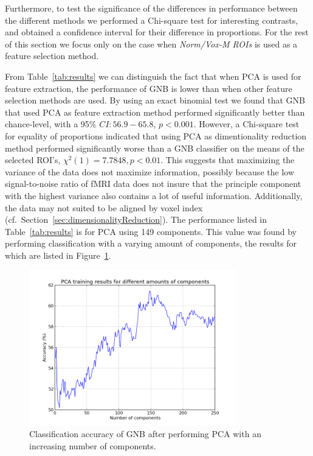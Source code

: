 \documentclass[preprint,journal,11pt]{vgtc}
\begin{document}
Furthermore, to test the significance of the differences in performance between the different methods we performed a Chi-square test for interesting contrasts, and obtained a confidence interval for their difference in proportions. For the rest of this section we focus only on the case when \emph{Norm/Vox-M ROIs} is used as a feature selection method.

From Table~\ref{tab:results} we can distinguish the fact that when PCA is used for feature extraction, the performance of GNB is lower than when other feature selection methods are used. By using an exact binomial test we found that GNB that used PCA as feature extraction method performed significantly better than chance-level, with a 95\% $CI: 56.9 - 65.8$, $p < 0.001$. However, a Chi-square test for equality of proportions indicated that using PCA as dimentionality reduction method performed significantly worse than a GNB classifier on the means of the selected ROI's, $\chi^2(1) = 7.7848, p < 0.01$. This suggests that maximizing the variance of the data does not maximize information, possibly because the low signal-to-noise ratio of fMRI data does not insure that the principle component with the highest variance also contains a lot of useful information. Additionally, the data may not suited to be aligned by voxel index (cf.~Section~\ref{sec:dimensionalityReduction}). The performance listed in Table~\ref{tab:results} is for PCA using 149 components. This value was found by performing classification with a varying amount of components, the results for which are listed in Figure~\ref{fig:pca_components}.

\begin{figure}
	\centering
	\includegraphics[width=90mm]{figures/pca_plot_by_index.png}
  	\caption{Classification accuracy of GNB after performing PCA with an increasing number of components.}
  	\label{fig:pca_components}
\end{figure}
\end{document}
